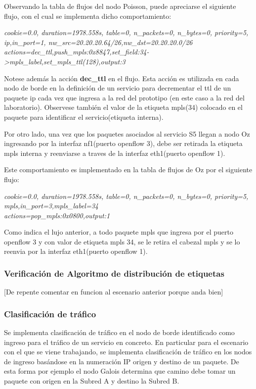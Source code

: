 Observando la tabla de flujos del nodo Poisson, puede apreciarse el siguiente flujo, con el cual se implementa dicho comportamiento:

\begin{center}
\textit{cookie=0.0, duration=1978.558s, table=0, n\_packets=0, n\_bytes=0, priority=5, \\
ip,in\_port=1, nw\_src=20.20.20.64/26,nw\_dst=20.20.20.0/26 \\
actions=dec\_ttl,push\_mpls:0x8847,set\_field:34->mpls\_label,set\_mpls\_ttl(128),output:3 }
\end{center}

Notese adem\'as la acci\'on \textbf{dec\_ttl} en el flujo. Esta acci\'on es utilizada en cada nodo de borde en la definici\'on de un servicio para decrementar el ttl de un paquete ip cada vez que ingresa a la red del prototipo (en este caso a la red del laboratorio). Observese tambi\'en el valor de la etiqueta mpls(34) colocado en el paquete para identificar el servicio(etiqueta interna).

Por otro lado, una vez que los paquetes asociados al servicio S5 llegan a nodo Oz ingresando por la interfaz nf1(puerto openflow 3), debe ser retirada la etiqueta mpls interna y reenviarse a traves de la interfaz eth1(puerto openflow 1).

Este comportamiento es implementado en la tabla de flujos de Oz por el siguiente flujo:

\begin{center}
\textit{cookie=0.0, duration=1978.558s, table=0, n\_packets=0, n\_bytes=0, priority=5, \\
mpls,in\_port=3,mpls\_label=34 \\
actions=pop\_mpls:0x0800,output:1 }
\end{center}

Como indica el lujo anterior, a todo paquete mpls que ingresa por el puerto openflow 3 y con valor de etiqueta mpls 34, se le retira el cabezal mpls y se lo reenvia por la interfaz eth1(puerto openflow 1). 

\subsubsection{Verificaci\'on de Algoritmo de distribución de etiquetas}

[De repente comentar en funcion al escenario anterior porque anda bien]

\subsubsection{Clasificaci\'on de tr\'afico}
Se implementa clasificaci\'on de tr\'afico en el nodo de borde identificado como ingreso para el tr\'afico de un servicio en concreto. En particular para el escenario con el que se viene trabajando, se implementa clasificaci\'on de tr\'afico en los nodos de ingreso basándose en la numeraci\'on IP origen y destino de un paquete. De esta forma por ejemplo el nodo Galois determina que camino debe tomar un paquete con origen en la Subred A y destino la Subred B. 

